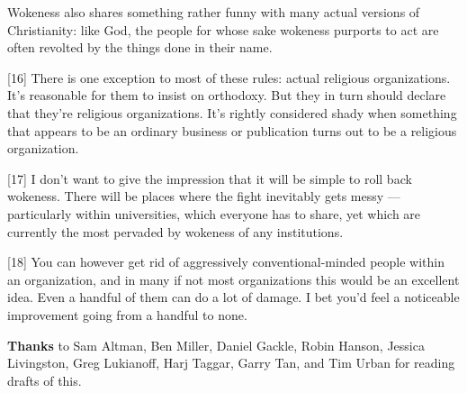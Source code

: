Wokeness also shares
                  something rather funny with many actual versions of
                  Christianity: like God, the people for whose sake wokeness
                  purports to act are often revolted by the things done in their
                  name.

[16] There is one exception to most of these rules: actual
                  religious organizations. It's reasonable for them to insist on
                  orthodoxy. But they in turn should declare that they're
                  religious organizations. It's rightly considered shady when
                  something that appears to be an ordinary business or
                  publication turns out to be a religious organization.

[17] I don't want to give the impression that it will be simple
                  to roll back wokeness. There will be places where the fight
                  inevitably gets messy --- particularly within
                  universities, which everyone has to share, yet which are
                  currently the most pervaded by wokeness of any
                  institutions.

[18] You can however get rid of aggressively conventional-minded
                  people within an organization, and in many if not most
                  organizations this would be an excellent idea. Even a handful
                  of them can do a lot of damage. I bet you'd feel a noticeable
                  improvement going from a handful to none.



\textbf{Thanks} to Sam Altman, Ben Miller, Daniel Gackle,
                    Robin Hanson, Jessica Livingston, Greg Lukianoff, Harj
                    Taggar, Garry Tan, and Tim Urban for reading drafts of
                    this.


              
            
          
          
            
              
                


                  
              
            
          
        
